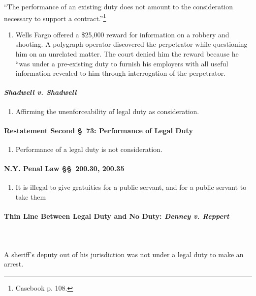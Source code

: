 ``The performance of an existing duty does not amount to the consideration 
necessary to support a contract.''\footnote{Casebook p. 108.}

\begin{enumerate}
    \item Wells Fargo offered a \$25,000 reward for information on a robbery 
    and shooting. A polygraph operator discovered the perpetrator while 
    questioning him on an unrelated matter. The court denied him the reward 
    because he ``was under a pre-existing duty to furnish his employers with 
    all useful information revealed to him through interrogation of the 
    perpetrator.
\end{enumerate}

\paragraph{\emph{Shadwell v. Shadwell}}

\begin{enumerate}
    \item Affirming the unenforceability of legal duty as consideration.
\end{enumerate}

\paragraph{Restatement Second \S\ 73: Performance of Legal Duty}

\begin{enumerate}
    \item Performance of a legal duty is not consideration.
\end{enumerate}

\paragraph{N.Y. Penal Law \S\S\ 200.30, 200.35}

\begin{enumerate}
    \item It is illegal to give gratuities for a public servant, and for a 
    public servant to take them
\end{enumerate}

\paragraph{Thin Line Between Legal Duty and No Duty: \emph{Denney v. Reppert}}
~\\\\
A sheriff's deputy out of his jurisdiction was not under a legal duty to make 
an arrest.

